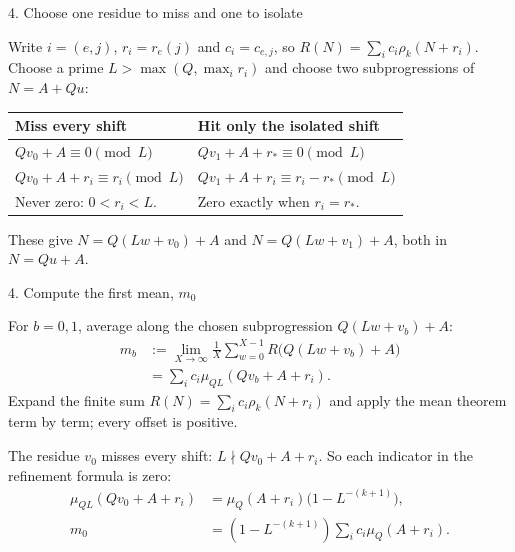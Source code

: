 \documentclass[11pt,aspectratio=169]{beamer}
\begin{document}

\begin{frame}{4. Choose one residue to miss and one to isolate}

Write $i=(e,j)$, $r_i=r_e(j)$ and $c_i=c_{e,j}$, so
$R(N)=\sum_i c_i\rho_k(N+r_i)$.
Choose a prime $L>\max(Q,\max_i r_i)$ and choose two subprogressions of $N=A+Qu$:
\begin{center}
\renewcommand{\arraystretch}{1.6}
\begin{tabular}{@{}p{5.7cm}p{6.2cm}@{}}
\toprule
\textbf{Miss every shift} & \textbf{Hit only the isolated shift}\\
\midrule
$Qv_0+A\equiv0\pmod L$
& $Qv_1+A+r_*\equiv0\pmod L$\\
$Qv_0+A+r_i\equiv r_i\pmod L$
& $Qv_1+A+r_i\equiv r_i-r_*\pmod L$\\
Never zero: $0<r_i<L$.
& Zero exactly when $r_i=r_*$.\\
\bottomrule
\end{tabular}
\end{center}
These give $N=Q(Lw+v_0)+A$ and $N=Q(Lw+v_1)+A$, both in $N=Qu+A$.

\end{frame}


\begin{frame}{4. Compute the first mean, $m_0$}

For $b=0,1$, average along the chosen subprogression $Q(Lw+v_b)+A$:
\[
 \begin{aligned}
 m_b&:=\lim_{X\to\infty}\frac1X\sum_{w=0}^{X-1}R\bigl(Q(Lw+v_b)+A\bigr)\\
    &=\sum_i c_i\mu_{QL}(Qv_b+A+r_i).
 \end{aligned}
\]
Expand the finite sum $R(N)=\sum_i c_i\rho_k(N+r_i)$ and apply the mean
theorem term by term; every offset is positive.

The residue $v_0$ misses every shift: $L\nmid Qv_0+A+r_i$.
So each indicator in the refinement formula is zero:
\[
 \begin{aligned}
 \mu_{QL}(Qv_0+A+r_i)&=\mu_Q(A+r_i)\bigl(1-L^{-(k+1)}\bigr),\\
 m_0&=(1-L^{-(k+1)})\sum_i c_i\mu_Q(A+r_i).
 \end{aligned}
\]

\end{frame}
\end{document}
